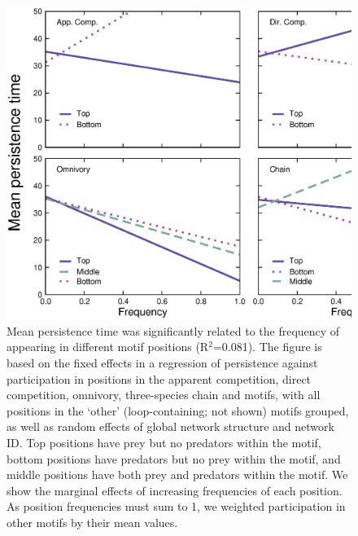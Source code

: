 \documentclass[12pt]{article}
\begin{document}
    \clearpage


    \begin{figure}[ht!]
        \centering
        \includegraphics[width=\textwidth]{figures/roles/persistence_vs_positions_freq.eps}
        \caption{Mean persistence time was significantly related to the frequency of appearing in different motif positions (R$^2$=0.081). The figure is based on the fixed effects in a regression of persistence against participation in positions in the apparent competition, direct competition, omnivory, three-species chain and motifs, with all positions in the `other' (loop-containing; not shown) motifs grouped, as well as random effects of global network structure and network ID. Top positions have prey but no predators within the motif, bottom positions have predators but no prey within the motif, and middle positions have both prey and predators within the motif. We show the marginal effects of increasing frequencies of each position. As position frequencies must sum to 1, we weighted participation in other motifs by their mean values.}
        \label{fig:persistence_positions}
    \end{figure}

    \clearpage
\end{document}

